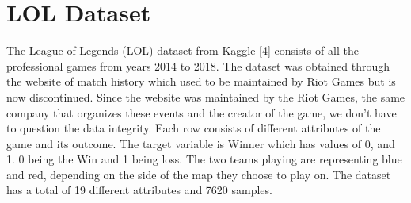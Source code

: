 \documentclass[conference]{IEEEtran}
\begin{document}
\section{LOL Dataset}
The League of Legends (LOL) dataset from Kaggle [4] consists of all the professional games from years 2014 to 2018. The dataset was obtained through the website of match history which used to be maintained by Riot Games but is now discontinued. Since the website was maintained by the Riot Games, the same company that organizes these events and the creator of the game, we don't have to question the data integrity. Each row consists of different attributes of the game and its outcome. The target variable is Winner which has values of 0, and 1. 0 being the Win and 1 being loss. The two teams playing are representing blue and red, depending on the side of the map they choose to play on. The dataset has a total of 19 different attributes and 7620 samples.
\end{document}
